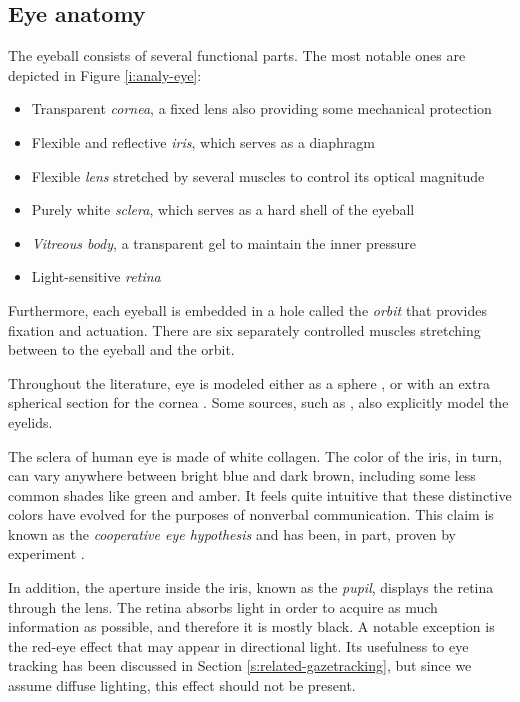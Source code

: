 \subsection{Eye anatomy}
\label{s.eyeanatomy}

The eyeball consists of several functional parts.
The most notable ones are depicted in Figure \ref{i:analy-eye}:
\begin{itemize}
\item Transparent \textit{cornea}, a fixed lens also providing some mechanical protection
\item Flexible and reflective \textit{iris}, which serves as a diaphragm
\item Flexible \textit{lens} stretched by several muscles to control its optical magnitude
\item Purely white \textit{sclera}, which serves as a hard shell of the eyeball
\item \textit{Vitreous body}, a transparent gel to maintain the inner pressure
\item Light-sensitive \textit{retina}
\end{itemize}

Furthermore, each eyeball is embedded in a hole called the \textit{orbit} that provides fixation and actuation.
There are six separately controlled muscles stretching between to the eyeball and the orbit.

Throughout the literature, eye is modeled either as a sphere \cite{zhang13}, or with an extra spherical section for the cornea \cite{villanueva08}.
Some sources, such as \cite{wang16}, also explicitly model the eyelids.

The sclera of human eye is made of white collagen.
The color of the iris, in turn, can vary anywhere between bright blue and dark brown, including some less common shades like green and amber.
It feels quite intuitive that these distinctive colors have evolved for the purposes of nonverbal communication.
This claim is known as the \textit{cooperative eye hypothesis} and has been, in part, proven by experiment \cite{tomasello07}.

In addition, the aperture inside the iris, known as the \textit{pupil}, displays the retina through the lens.
The retina absorbs light in order to acquire as much information as possible, and therefore it is mostly black.
A notable exception is the red-eye effect that may appear in directional light.
Its usefulness to eye tracking has been discussed in Section \ref{s:related-gazetracking}, but since we assume diffuse lighting, this effect should not be present.

